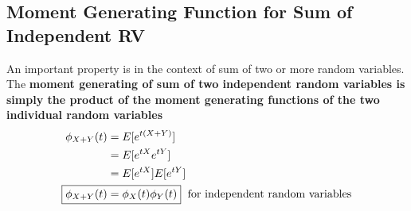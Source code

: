\documentclass[../probability-notes.tex]{subfiles}
\begin{document}
    \subsection{Moment Generating Function for Sum of Independent RV}
    An important property is in the context of sum of two or more random variables. The \textbf{moment generating of sum of two independent random variables is simply the product of the moment generating functions of the two individual random variables}
    \begin{align*}
        \phi_{X+Y}(t) &= E[e^{t(X+Y)}]\\
        &= E[e^{tX} e^{tY}]\\
        &= E[e^{tX}] E[e^{tY}]\\
        \Aboxed{\phi_{X+Y}(t) &= \phi_{X}(t) \phi_{Y}(t)} \text{\; for independent random variables}
    \end{align*}
\end{document}
